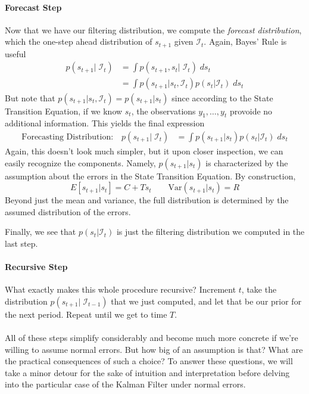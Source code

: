 \documentclass[a4paper,12pt]{article}
\begin{document}
\paragraph{Forecast Step} Now that we have our filtering distribution, we compute the \emph{forecast distribution}, which the one-step ahead distribution of $s_{t+1}$ given $\mathcal{I}_{t}$. Again, Bayes' Rule is useful
\begin{align*}
  p(s_{t+1} | \; \mathcal{I}_{t}) &= 
    \int p(s_{t+1}, s_t |\; \mathcal{I}_{t}) \; ds_t \\
  &= \int p(s_{t+1} |  s_t, \mathcal{I}_{t}) 
    p(s_t |  \mathcal{I}_{t}) \; ds_t 
\end{align*}
But note that $p(s_{t+1} | s_t, \mathcal{I}_{t}) = p(s_{t+1}|s_t)$ since according to the State Transition Equation, if we know $s_{t}$, the observations $y_1, \ldots, y_t$ provoide no additional information. This yields the final expression
\begin{align}
  \text{Forecasting Distribution:} \quad
  p(s_{t+1} | \; \mathcal{I}_{t}) 
  &= \int p(s_{t+1} |  s_t) 
    p(s_t |  \mathcal{I}_{t}) \; ds_t 
\end{align}
Again, this doesn't look much simpler, but it upon closer inspection, we can easily recognize the components. Namely, $p(s_{t+1}|s_t)$ is characterized by the assumption about the errors in the State Transition Equation. By construction,
\[
  E[s_{t+1}|s_t] = C + Ts_t
  \qquad 
  \text{Var}(s_{t+1}|s_t) = R
\]
Beyond just the mean and variance, the full distribution is
determined by the assumed distribution of the errors.

Finally, we see that $p(s_t|\mathcal{I}_{t})$ is just the
filtering distribution we computed in the last step. 

\paragraph{Recursive Step} What exactly makes this whole procedure recursive? Increment $t$, take the distribution $p(s_{t+1}|\;\mathcal{I}_{t-1})$ that we just computed, and let that be our prior for the next period. Repeat until we get to time $T$.
\\
\\
All of these steps simplify considerably and become much more concrete if we're willing to assume normal errors. But how big of an assumption is that? What are the practical consequences of such a choice? To answer these questions, we will take a minor detour for the sake of intuition and interpretation before delving into the particular case of the Kalman Filter under normal errors.
\end{document}
